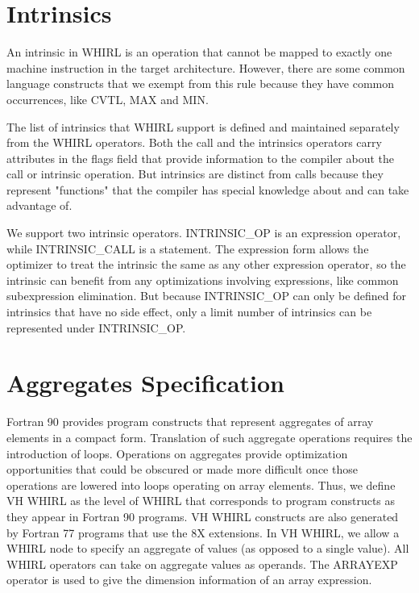 \documentclass{article}
\begin{document}
\section{Intrinsics}

An intrinsic in WHIRL is an operation that cannot be mapped to
exactly one machine instruction in the target architecture. However,
there are some common language constructs that we exempt from this
rule because they have common occurrences, like
CVTL, MAX and MIN.

The list of intrinsics that WHIRL support is defined and maintained
separately from the WHIRL operators. Both the call and the intrinsics
operators carry attributes in the flags field that provide information
to the compiler about the call or intrinsic operation. But intrinsics
are distinct from calls because they represent "functions" that
the compiler has special knowledge about and can take advantage
of.

We support two intrinsic operators. INTRINSIC\_OP is an expression
operator, while INTRINSIC\_CALL is a statement. The expression form allows the
optimizer to treat the intrinsic the same as any other expression
operator, so the intrinsic can benefit from any optimizations
involving expressions, like common subexpression elimination. But
because INTRINSIC\_OP can only be defined for intrinsics that have
no side effect, only a limit number of intrinsics can be represented
under INTRINSIC\_OP.

\section{Aggregates Specification}

Fortran 90 provides program constructs that represent aggregates
of array elements in a compact form. Translation of such aggregate
operations requires the introduction of loops. Operations on
aggregates provide optimization opportunities that could be obscured
or made more difficult once those operations are lowered into loops
operating on array elements. Thus, we define VH WHIRL as the level
of WHIRL that corresponds to program constructs as they appear in
Fortran 90 programs. VH WHIRL constructs are also generated by
Fortran 77 programs that use the 8X extensions. In VH WHIRL, we
allow a WHIRL node to specify an aggregate of values (as opposed
to a single value). All WHIRL operators can take on aggregate values
as operands. The ARRAYEXP operator is used to give the dimension
information of an array expression.
\end{document}
